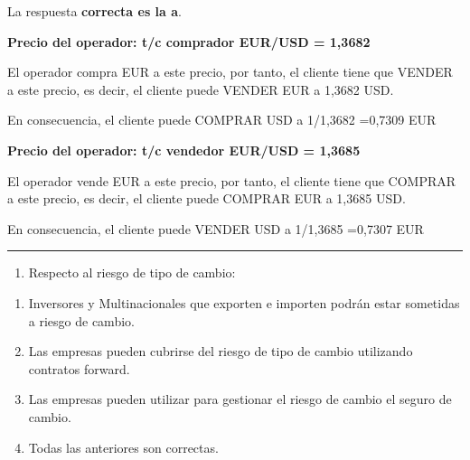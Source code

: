 \documentclass[
  letterpaper,
  DIV=11,
  numbers=noendperiod]{scrreprt}
\providecommand{\tightlist}{%
  \setlength{\itemsep}{0pt}\setlength{\parskip}{0pt}}\usepackage{longtable,booktabs,array}
\begin{document}
\begin{tcolorbox}[enhanced jigsaw, left=2mm, opacityback=0, colback=white, breakable, arc=.35mm, bottomrule=.15mm, rightrule=.15mm, toprule=.15mm, leftrule=.75mm, colframe=quarto-callout-tip-color-frame]
\begin{minipage}[t]{5.5mm}
\textcolor{quarto-callout-tip-color}{\faLightbulb}
\end{minipage}%
\begin{minipage}[t]{\textwidth - 5.5mm}

La respuesta \textbf{correcta es la a}.

\textbf{Precio del operador: t/c comprador EUR/USD = 1,3682}

El operador compra EUR a este precio, por tanto, el cliente tiene que
VENDER a este precio, es decir, el cliente puede VENDER EUR a 1,3682
USD.

En consecuencia, el cliente puede COMPRAR USD a 1/1,3682 =0,7309 EUR

\textbf{Precio del operador: t/c vendedor EUR/USD = 1,3685}

El operador vende EUR a este precio, por tanto, el cliente tiene que
COMPRAR a este precio, es decir, el cliente puede COMPRAR EUR a 1,3685
USD.

En consecuencia, el cliente puede VENDER USD a 1/1,3685 =0,7307 EUR

\end{minipage}%
\end{tcolorbox}

\begin{center}\rule{0.5\linewidth}{0.5pt}\end{center}

\begin{enumerate}
\def\labelenumi{\arabic{enumi}.}
\setcounter{enumi}{34}
\tightlist
\item
  Respecto al riesgo de tipo de cambio:
\end{enumerate}

\begin{enumerate}
\def\labelenumi{\alph{enumi}.}
\item
  Inversores y Multinacionales que exporten e importen podrán estar
  sometidas a riesgo de cambio.
\item
  Las empresas pueden cubrirse del riesgo de tipo de cambio utilizando
  contratos forward.
\item
  Las empresas pueden utilizar para gestionar el riesgo de cambio el
  seguro de cambio.
\item
  Todas las anteriores son correctas.
\end{enumerate}
\end{document}
